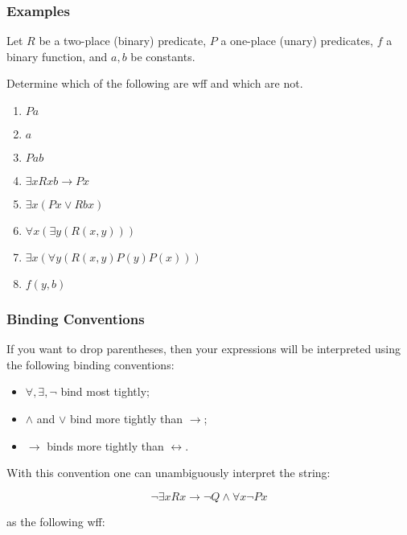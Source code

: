 \documentclass{beamer}
\theoremstyle{indentDefn} \newtheorem{defn}[]{Definition}
\begin{document}
\begin{frame}
	\frametitle{Examples}
	
	Let $R$ be a two-place (binary) predicate, $P$ a one-place (unary) predicates, $f$ a binary function, and $a,b$ be constants. 
	
	\vspace{0.5cm}
	
	Determine which of the following are wff and which are not. 
	
	\begin{enumerate}
		\item $Pa$
		\item $a$
		\item $Pab$
		\item $\exists x Rxb \rightarrow Px$
		\item $\exists x (Px \lor Rbx)$
		\item $\forall x (\exists y (R(x,y)))$
		\item $\exists x (\forall y (R(x,y)P(y)P(x)))$
		\item $f(y,b)$
	\end{enumerate}
\end{frame}

\begin{frame}
	\frametitle{Binding Conventions}
	
	If you want to drop parentheses, then your expressions will be interpreted using the following binding conventions: 
	
	\begin{itemize}
		\item $\forall, \exists, \lnot$ bind most tightly; 
		\item $\land$ and $\lor$ bind more tightly than $\rightarrow$; 
		\item $\rightarrow$ binds more tightly than $\leftrightarrow$. 
	\end{itemize}

	\vspace{0.5cm}

	With this convention one can unambiguously interpret the string:
	
	$$ \lnot \exists x Rx \rightarrow \lnot Q \land \forall x \lnot Px$$
	
	as the following wff:
	
	
	
\end{frame}
\end{document}
